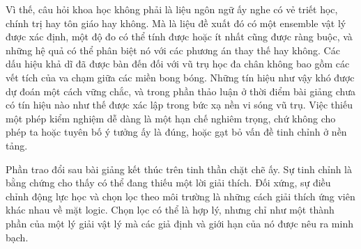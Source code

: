 Vì thế, câu hỏi khoa học không phải là liệu ngôn ngữ ấy nghe có vẻ triết học, chính trị hay tôn giáo hay không. Mà là liệu đề xuất đó có một ensemble vật lý được xác định, một độ đo có thể tính được hoặc ít nhất cũng được ràng buộc, và những hệ quả có thể phân biệt nó với các phương án thay thế hay không. Các dấu hiệu khả dĩ đã được bàn đến đối với vũ trụ học đa chân không bao gồm các vết tích của va chạm giữa các miền bong bóng. Những tín hiệu như vậy khó được dự đoán một cách vững chắc, và trong phần thảo luận ở thời điểm bài giảng chưa có tín hiệu nào như thế được xác lập trong bức xạ nền vi sóng vũ trụ. Việc thiếu một phép kiểm nghiệm dễ dàng là một hạn chế nghiêm trọng, chứ không cho phép ta hoặc tuyên bố ý tưởng ấy là đúng, hoặc gạt bỏ vấn đề tinh chỉnh ở nền tảng.

\begin{classroomqa}
\end{classroomqa}

Phần trao đổi sau bài giảng kết thúc trên tinh thần chặt chẽ ấy. Sự tinh chỉnh là bằng chứng cho thấy có thể đang thiếu một lời giải thích. Đối xứng, sự điều chỉnh động lực học và chọn lọc theo môi trường là những cách giải thích ứng viên khác nhau về mặt logic. Chọn lọc có thể là hợp lý, nhưng chỉ như một thành phần của một lý giải vật lý mà các giả định và giới hạn của nó được nêu ra minh bạch.
